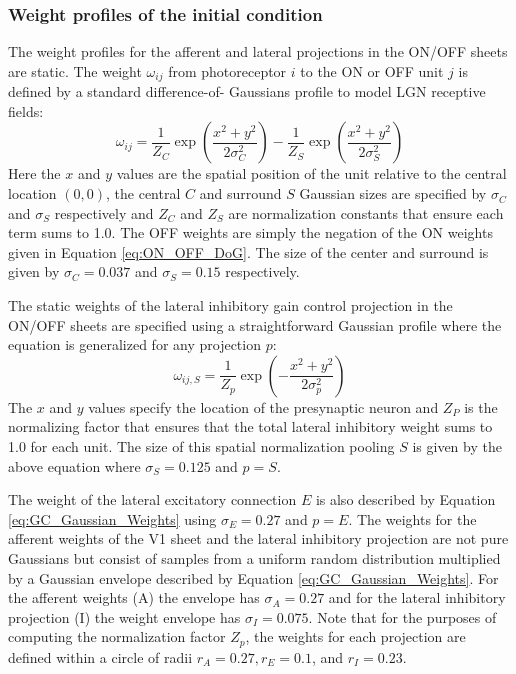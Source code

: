 \documentclass[phd,ianc,twoside]{infthesis}
\begin{document}
\subsubsection*{Weight profiles of the initial condition}

The weight profiles for the afferent and lateral projections in the
ON/OFF sheets are static. The weight $\omega_{ij}$ from photoreceptor
$i$ to the ON or OFF unit $j$ is defined by a standard difference-of-
Gaussians profile to model LGN receptive fields:
\begin{equation}
\label{eq:ON_OFF_DoG}
\omega_{ij} = \frac{1}{Z_C} \exp \left( \frac{x^2 + y^2}{2 \sigma^2_C}\right)
   - \frac{1}{Z_S} \exp \left(\frac{x^2 + y^2}{2 \sigma^2_S} \right)
\end{equation}
Here the $x$ and $y$ values are the spatial position of the unit
relative to the central location $(0,0)$, the central $C$ and surround
$S$ Gaussian sizes are specified by $\sigma_C$ and $\sigma_S$
respectively and $Z_C$ and $Z_S$ are normalization constants that ensure
each term sums to 1.0. The OFF weights are simply the negation of the ON
weights given in Equation \ref{eq:ON_OFF_DoG}.  The size of the
center and surround is given by $\sigma_C=0.037$ and $\sigma_S=0.15$
respectively.

The static weights of the lateral inhibitory gain control projection in
the ON/OFF sheets are specified using a straightforward Gaussian profile
where the equation is generalized for any projection $p$:
\begin{equation}
\label{eq:GC_Gaussian_Weights}
\omega_{ij,S} = \frac{1}{Z_p} \exp \left( -\frac{x^2 + y^2}{2 \sigma_p^2}\right)
\end{equation}
The $x$ and $y$ values specify the location of the presynaptic neuron
and $Z_P$ is the normalizing factor that ensures that the total lateral
inhibitory weight sums to 1.0 for each unit. The size
of this spatial normalization pooling $S$ is given by the above equation
where $\sigma_S=0.125$ and $p=S$.

The weight of the lateral excitatory connection $E$ is also described
by Equation \ref{eq:GC_Gaussian_Weights} using $\sigma_E=0.27$ and
$p=E$. The weights for the afferent weights of the V1 sheet and the
lateral inhibitory projection are not pure Gaussians but consist of
samples from a uniform random distribution multiplied by a Gaussian
envelope described by Equation \ref{eq:GC_Gaussian_Weights}. For the
afferent weights (A) the envelope has $\sigma_A=0.27$ and for the
lateral inhibitory projection (I) the weight envelope has
$\sigma_I=0.075$. Note that for the purposes of computing the
normalization factor $Z_p$, the weights for each projection are defined
within a circle of radii $r_A=0.27, r_E=0.1$, and $r_I =0.23$.
\end{document}

